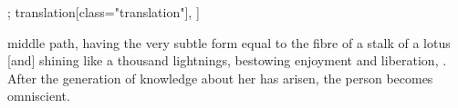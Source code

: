 \begin{alignment}[
    texts=edition[class="edition"];
    translation[class="translation"],
  ]
\begin{translation}
\begin{tlate}[p03_1]
middle path, having the very subtle form equal to the fibre of a stalk of a lotus [and] shining like a thousand lightnings, bestowing enjoyment and liberation, . After the generation of knowledge about her has arisen, the person becomes omniscient. 
\end{tlate}
   \end{translation}
 \end{alignment}
\pagebreak %
